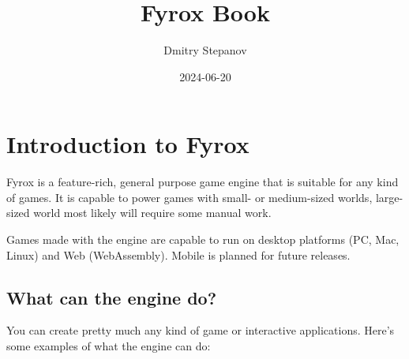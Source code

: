 \documentclass[
]{book}
\title{Fyrox Book}
\author{Dmitry Stepanov}
\date{2024-06-20}
\theoremstyle{definition}
\theoremstyle{definition}
\theoremstyle{definition}
\theoremstyle{definition}
\theoremstyle{remark}
\begin{document}
\maketitle

{
\setcounter{tocdepth}{1}
\tableofcontents
}
\chapter{Introduction to Fyrox}\label{introduction-to-fyrox}

Fyrox is a feature-rich, general purpose game engine that is suitable for any kind of games. It is capable to power games with small- or medium-sized worlds, large-sized world most likely will require some manual work.

Games made with the engine are capable to run on desktop platforms (PC, Mac, Linux) and Web (WebAssembly). Mobile is planned for future releases.

\section{What can the engine do?}\label{what-can-the-engine-do}

You can create pretty much any kind of game or interactive applications. Here's some examples of what the engine can do:
\end{document}

